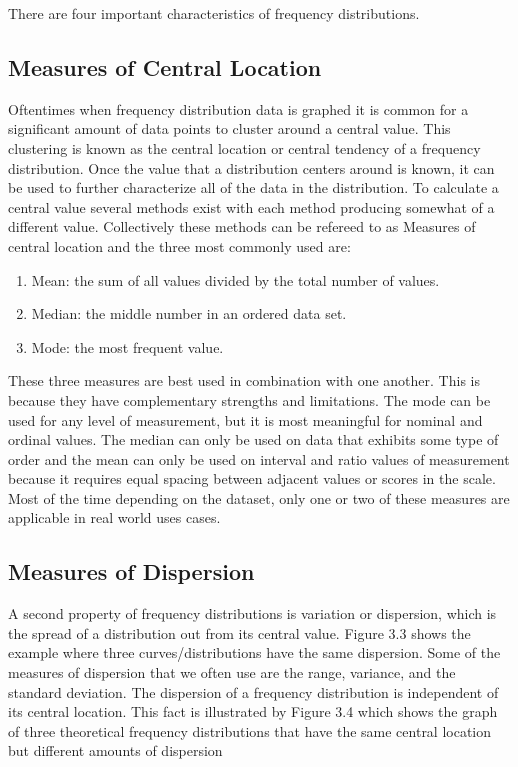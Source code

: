 There are four important characteristics of frequency distributions.

\subsection{Measures of Central Location}

Oftentimes when frequency distribution data is graphed it is common for a significant
amount of data points to cluster around a central value. This clustering is known 
as the central location or central tendency of a frequency distribution. Once the 
value that a distribution centers around is known, it can be used to further 
characterize all of the data in the distribution. To calculate a central value 
several methods exist with each method producing somewhat of a different value. 
Collectively these methods can be refereed to as Measures of central location and 
the three most commonly used are:

\begin{enumerate}
    \item Mean: the sum of all values divided by the total number of values.
    \item Median: the middle number in an ordered data set.
    \item Mode: the most frequent value.
\end{enumerate}

These three measures are best used in combination with one another. This is because 
they have complementary strengths and limitations. The mode can be used for any 
level of measurement, but it is most meaningful for nominal and ordinal values.
The median can only be used on data that exhibits some type of order and the mean 
can only be used on interval and ratio values of measurement because it requires 
equal spacing between adjacent values or scores in the scale. Most of the time 
depending on the dataset, only one or two of these measures are applicable in real 
world uses cases.

\subsection{Measures of Dispersion}

A second property of frequency distributions is variation or dispersion, which is 
the spread of a distribution out from its central value. Figure 3.3 shows the 
example where three curves/distributions have the same dispersion. Some of the 
measures of dispersion that we often use are the range, variance, and the standard 
deviation. The dispersion of a frequency distribution is independent of its central 
location. This fact is illustrated by Figure 3.4 which shows the graph of three 
theoretical frequency distributions that have the same central location but 
different amounts of dispersion

